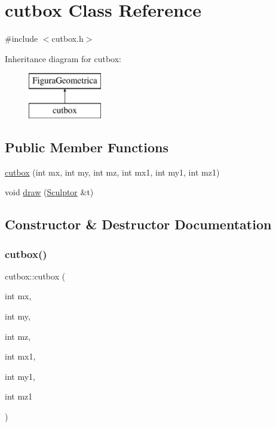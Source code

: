 \hypertarget{classcutbox}{}\section{cutbox Class Reference}
\label{classcutbox}


{\ttfamily \#include $<$cutbox.\+h$>$}

Inheritance diagram for cutbox\+:\begin{figure}[H]
\begin{center}
\leavevmode
\includegraphics[height=2.000000cm]{classcutbox}
\end{center}
\end{figure}
\subsection*{Public Member Functions}
\begin{DoxyCompactItemize}
\item 
\mbox{\hyperlink{classcutbox_a87b94263ef307f61fcd2f33793e4337d}{cutbox}} (int mx, int my, int mz, int mx1, int my1, int mz1)
\item 
void \mbox{\hyperlink{classcutbox_a4ba67b689b29c977d4162109bf2f929b}{draw}} (\mbox{\hyperlink{class_sculptor}{Sculptor}} \&t)
\end{DoxyCompactItemize}


\subsection{Constructor \& Destructor Documentation}
\mbox{\label{classcutbox_a87b94263ef307f61fcd2f33793e4337d}} 
\subsubsection{\texorpdfstring{cutbox()}{cutbox()}}
{\footnotesize\ttfamily cutbox\+::cutbox (\begin{DoxyParamCaption}\item[{int}]{mx,  }\item[{int}]{my,  }\item[{int}]{mz,  }\item[{int}]{mx1,  }\item[{int}]{my1,  }\item[{int}]{mz1 }\end{DoxyParamCaption})}




